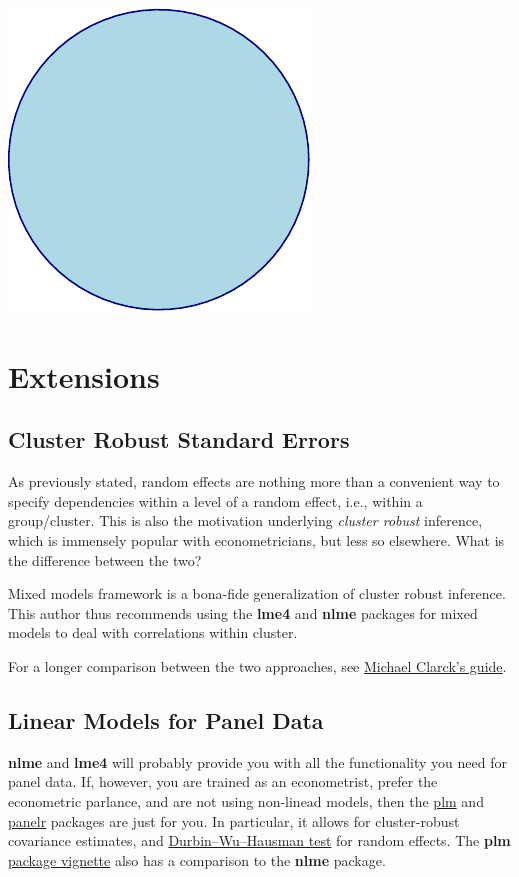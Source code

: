 \documentclass[]{book}
\theoremstyle{definition}
\theoremstyle{definition}
\theoremstyle{definition}
\theoremstyle{remark}
\begin{document}
\includegraphics[width=0.5\linewidth]{Rcourse_files/figure-latex/unnamed-chunk-218-1}

\section{Extensions}\label{extensions-1}

\subsection{Cluster Robust Standard Errors}\label{cr-se}

As previously stated, random effects are nothing more than a convenient
way to specify dependencies within a level of a random effect, i.e.,
within a group/cluster. This is also the motivation underlying
\emph{cluster robust} inference, which is immensely popular with
econometricians, but less so elsewhere. What is the difference between
the two?

Mixed models framework is a bona-fide generalization of cluster robust
inference. This author thus recommends using the \textbf{lme4} and
\textbf{nlme} packages for mixed models to deal with correlations within
cluster.

For a longer comparison between the two approaches, see
\href{https://m-clark.github.io/docs/clustered/}{Michael Clarck's
guide}.

\subsection{Linear Models for Panel
Data}\label{linear-models-for-panel-data}

\textbf{nlme} and \textbf{lme4} will probably provide you with all the
functionality you need for panel data. If, however, you are trained as
an econometrist, prefer the econometric parlance, and are not using
non-linead models, then the
\href{https://cran.r-project.org/package=plm}{plm} and
\href{https://www.jacob-long.com/post/panelr-intro/}{panelr} packages
are just for you. In particular, it allows for cluster-robust covariance
estimates, and
\href{https://en.wikipedia.org/wiki/Durbin\%E2\%80\%93Wu\%E2\%80\%93Hausman_test}{Durbin--Wu--Hausman
test} for random effects. The \textbf{plm}
\href{https://cran.r-project.org/web/packages/plm/vignettes/plm.pdf}{package
vignette} also has a comparison to the \textbf{nlme} package.
\end{document}
